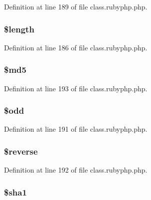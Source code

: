 Definition at line 189 of file class.\-rubyphp.\-php.

\hypertarget{classr_adf14d8e29912c1855022dfa252aa4087}{
\subsubsection[{\$length}]{\setlength{\rightskip}{0pt plus 5cm}\${\bf length}}}\label{classr_adf14d8e29912c1855022dfa252aa4087}


Definition at line 186 of file class.\-rubyphp.\-php.

\hypertarget{classr_a2557b214f57a046187b88572e443da1f}{
\subsubsection[{\$md5}]{\setlength{\rightskip}{0pt plus 5cm}\${\bf md5}}}\label{classr_a2557b214f57a046187b88572e443da1f}


Definition at line 193 of file class.\-rubyphp.\-php.

\hypertarget{classr_aee2d4fa4e98da4e6ad23bee644ab5e7a}{
\subsubsection[{\$odd}]{\setlength{\rightskip}{0pt plus 5cm}\${\bf odd}}}\label{classr_aee2d4fa4e98da4e6ad23bee644ab5e7a}


Definition at line 191 of file class.\-rubyphp.\-php.

\hypertarget{classr_ae0d210fd358fa750a11e63b26f6d26ea}{
\subsubsection[{\$reverse}]{\setlength{\rightskip}{0pt plus 5cm}\${\bf reverse}}}\label{classr_ae0d210fd358fa750a11e63b26f6d26ea}


Definition at line 192 of file class.\-rubyphp.\-php.

\hypertarget{classr_a310d84f0b735d2ab692b4e2acd90e7ef}{
\subsubsection[{\$sha1}]{\setlength{\rightskip}{0pt plus 5cm}\${\bf sha1}}}\label{classr_a310d84f0b735d2ab692b4e2acd90e7ef}



